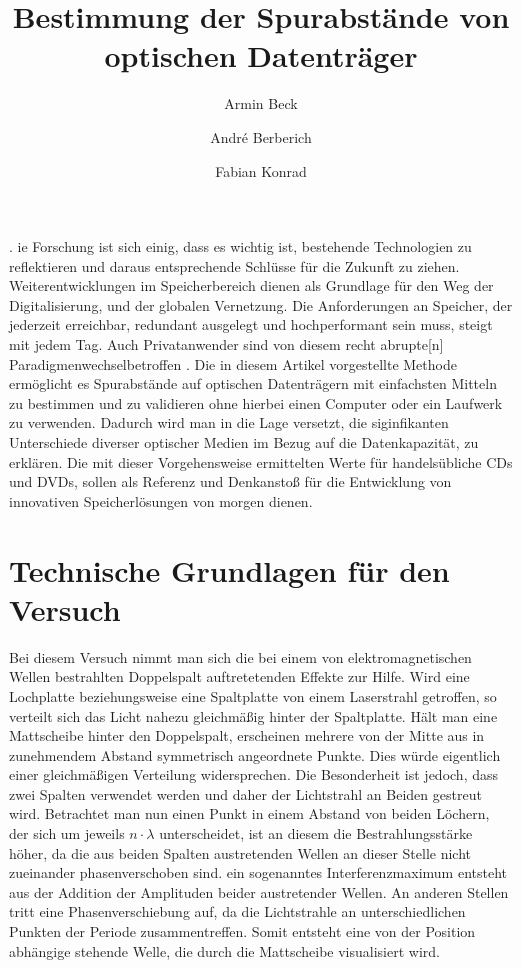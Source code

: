 \documentclass[9pt,twocolumn,twoside]{pnas-new}
\title{Bestimmung der Spurabstände von optischen Datenträger}
\author[a]{Armin Beck}
\author[a]{André Berberich}
\author[a]{Fabian Konrad}
\affil[a]{Student der DHBW Mosbach}
\begin{document}
\verticaladjustment{-2pt}

\maketitle
\thispagestyle{firststyle}
.
ie Forschung ist sich einig, dass es wichtig ist, bestehende Technologien zu reflektieren und daraus entsprechende Schlüsse für die Zukunft zu ziehen. Weiterentwicklungen im Speicherbereich dienen als Grundlage für den Weg der Digitalisierung, und der globalen Vernetzung. 
Die Anforderungen an Speicher, der jederzeit erreichbar, redundant ausgelegt und hochperformant sein muss, steigt mit jedem Tag.
Auch Privatanwender sind von diesem \glqq recht abrupte[n] Paradigmenwechsel\grqq \space betroffen \cite[Heft 10/2012 S.102]{CT1990}.
Die in diesem Artikel vorgestellte Methode ermöglicht es Spurabstände auf optischen Datenträgern mit einfachsten Mitteln zu bestimmen und zu validieren ohne hierbei einen Computer oder ein Laufwerk zu verwenden. Dadurch wird man in die Lage versetzt, die siginfikanten Unterschiede diverser optischer Medien im Bezug auf die Datenkapazität, zu erklären.
Die mit dieser Vorgehensweise ermittelten Werte für handelsübliche CDs und DVDs, sollen als Referenz und Denkanstoß für die Entwicklung von innovativen Speicherlösungen von morgen dienen.

\section*{Technische Grundlagen für den Versuch}
Bei diesem Versuch nimmt man sich die bei einem von elektromagnetischen Wellen bestrahlten Doppelspalt auftretetenden Effekte zur Hilfe. Wird eine Lochplatte beziehungsweise eine Spaltplatte von einem Laserstrahl getroffen, so verteilt sich das Licht nahezu gleichmäßig hinter der Spaltplatte. Hält man eine Mattscheibe hinter den Doppelspalt, erscheinen mehrere von der Mitte aus in zunehmendem Abstand symmetrisch angeordnete Punkte. Dies würde eigentlich einer gleichmäßigen Verteilung widersprechen. Die Besonderheit ist jedoch, dass zwei Spalten verwendet werden und daher der Lichtstrahl an Beiden gestreut wird. Betrachtet man nun einen Punkt in einem Abstand von beiden Löchern, der sich um jeweils \begin{math}n\cdot\lambda\end{math} unterscheidet, ist an diesem die Bestrahlungsstärke höher, da die aus beiden Spalten austretenden Wellen an dieser Stelle nicht zueinander phasenverschoben sind. ein sogenanntes Interferenzmaximum entsteht aus der Addition der Amplituden beider austretender Wellen. An anderen Stellen tritt eine Phasenverschiebung auf, da die Lichtstrahle an unterschiedlichen Punkten der Periode zusammentreffen. Somit entsteht eine von der Position abhängige stehende Welle, die durch die Mattscheibe visualisiert wird.
\end{document}
